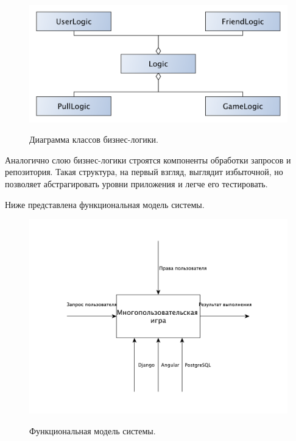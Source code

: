 \documentclass[a4paper,14pt]{extarticle}
\begin{document}
 	\begin{figure}[h!]
 		\begin{center}
 			{\includegraphics[scale = 0.4]{img/logic.pdf}}
 			\label{ris:logic}
 		\end{center}
 		\caption{Диаграмма классов бизнес-логики.}
 	\end{figure}
 	
 	Аналогично слою бизнес-логики строятся компоненты обработки запросов и репозитория. Такая структура, на первый взгляд, выглядит избыточной, но позволяет абстрагировать уровни приложения и легче его тестировать.
 	
 	\newpage
 	
 	Ниже представлена функциональная модель системы.
 	
 	\begin{figure}[h!]
 		\begin{center}
 			{\includegraphics[scale = 0.4]{img/func.pdf}}
 			\label{ris:func}
 		\end{center}
 		\caption{Функциональная модель системы.}
 	\end{figure}
 	
\end{document}
